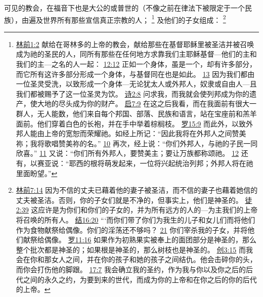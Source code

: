 \documentclass[12pt, a4paper, oneside]{ctexart}
\newcounter{parnum}[section]
\newcommand{\N}{%
   \noindent\refstepcounter{parnum}%
    \makebox[\parindent][l]{\textbf{\arabic{parnum}.}}}
\begin{document}
\N 可见的教会，在福音下也是大公的或普世的（不像之前在律法下被限定于一个民族），由遍及世界所有那些宣信真正宗教的人；
	\footnote {
		\href{https://biblehub.com/1_corinthians/1-2.htm}{林前1:2} 献给在哥林多的上帝的教会，献给那些在基督耶稣里被圣洁并被召唤成为祂的圣民的人，同所有那些在任何地方求靠我们主耶稣基督---他们的主和我们的主---之名的人一起：
		\href{https://biblehub.com/1_corinthians/12-12.htm}{12:12} 正如一个身体，虽是一个，却有许多部分，而它所有这许多部分形成一个身体，与基督同在也是如此。
		\href{https://biblehub.com/1_corinthians/12-13.htm}{13} 因为我们都由一位圣灵受洗，以致形成一个身体---无论犹太人或外邦人，奴隶或自由人---且我们都被赐予了这一位圣灵为饮。
		\href{https://biblehub.com/psalms/2-8.htm}{诗2:8} 问求我，而我就会使列邦成为你的遗产，使大地的尽头成为你的财产。
		\href{https://biblehub.com/revelation/7-9.htm}{启7:9} 在这之后我看，而在我面前有很大一群人，无人能数，他们来自每个邦国、部落、民族和语言，站在宝座前和羔羊面前。他们穿着白色的长袍，并在手中举着棕榈枝。
		\href{https://biblehub.com/romans/15-9.htm}{罗15:9} 而此外，以致外邦人能由上帝的宽恕而荣耀祂。如经上所记：“因此我将在外邦人之间赞美祢；我将歌唱赞美祢的名。”
		\href{https://biblehub.com/romans/15-10.htm}{10} 再次，经上说：“你们外邦人，与祂的子民一同欣喜。”
		\href{https://biblehub.com/romans/15-11.htm}{11} 又说：“你们所有外邦人，要赞美主；要让万族都称颂祂。
		\href{https://biblehub.com/romans/15-12.htm}{12} 还有，以赛亚说：“耶西的根将萌发起来，一位将兴起统治列邦；外邦人将在祂里面盼望。”
	}
	及他们的子女组成：
	\footnote {
		\href{https://biblehub.com/1_corinthians/7-14.htm}{林前7:14} 因为不信的丈夫已藉着他的妻子被圣洁，而不信的妻子也藉着她信的丈夫被圣洁。否则，你的子女们就是不净的，但事实上，他们是神圣的。
		\href{https://biblehub.com/acts/2-39.htm}{徒2:39} 这应许是为你们和你们的子女的，并为所有远方的人的---为主我们的上帝将召唤的所有人。
		\href{https://biblehub.com/ezekiel/16-20.htm}{结16:20} “‘而你们带了你们为我生的儿子和女儿们而将他们作为食物献祭给偶像。你们的淫荡还不够吗？
		\href{https://biblehub.com/ezekiel/16-21.htm}{21} 你们宰杀我的子女，并将他们献祭给偶像。
		\href{https://biblehub.com/romans/11-16.htm}{罗11:16} 如果作为初熟果实被奉上的面团部分是神圣的，那么整个批次都是神圣的；如果根是神圣的，那么树枝也是神圣的。
		\href{https://biblehub.com/genesis/3-15.htm}{创3:15} 而我会在你和那女人之间，并在你的孩子和她的孩子之间结仇。他会击碎你的头，而你会打伤他的脚跟。
		\href{https://biblehub.com/genesis/17-7.htm}{17:7} 我会确立我的圣约，作为我与你以及你之后的后代之间的永久之约，为要到来的世代，而成为你的上帝和在你之后的你的后代的上帝。
	}
\end{document}
